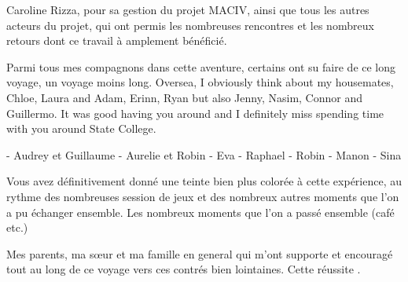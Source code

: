 Caroline Rizza, pour sa gestion du projet MACIV, ainsi que tous les autres acteurs du projet, qui ont permis les nombreuses rencontres et les nombreux retours dont ce travail à amplement bénéficié.

Parmi tous mes compagnons dans cette aventure, certains ont su faire de ce long voyage, un voyage moins long.
Oversea, I obviously think about my housemates, Chloe, Laura and Adam, Erinn, Ryan but also Jenny, Nasim, Connor and Guillermo.
It was good having you around and I definitely miss spending time with you around State College.

- Audrey et Guillaume
- Aurelie et Robin
- Eva
- Raphael
- Robin
- Manon
- Sina

Vous avez définitivement donné une teinte bien plus colorée à cette expérience, au rythme
des nombreuses session de jeux et des nombreux autres moments que l'on a pu échanger ensemble.
Les nombreux moments que l'on a passé ensemble (café etc.)

Mes parents, ma sœur et ma famille en general qui m'ont supporte et encouragé tout au
long de ce voyage vers ces contrés bien lointaines.
Cette réussite .

